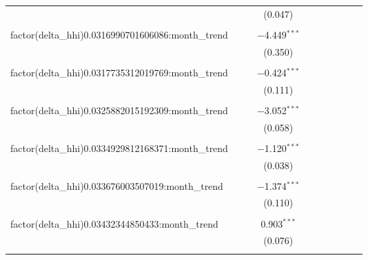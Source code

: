 \begin{table}[H]
{\begin{tabular}{@{\extracolsep{5pt}}lccccccccc}
   &  &  & (0.047) &  &  &  &  &  &  \\  

   & & & & & & & & & \\  

  factor(delta\_hhi)0.0316990701606086:month\_trend &  &  & $-$4.449$^{***}$ &  &  &  &  &  &  \\  

   &  &  & (0.350) &  &  &  &  &  &  \\  

   & & & & & & & & & \\  

  factor(delta\_hhi)0.0317735312019769:month\_trend &  &  & $-$0.424$^{***}$ &  &  &  &  &  &  \\  

   &  &  & (0.111) &  &  &  &  &  &  \\  

   & & & & & & & & & \\  

  factor(delta\_hhi)0.0325882015192309:month\_trend &  &  & $-$3.052$^{***}$ &  &  &  &  &  &  \\  

   &  &  & (0.058) &  &  &  &  &  &  \\  

   & & & & & & & & & \\  

  factor(delta\_hhi)0.0334929812168371:month\_trend &  &  & $-$1.120$^{***}$ &  &  &  &  &  &  \\  

   &  &  & (0.038) &  &  &  &  &  &  \\  

   & & & & & & & & & \\  

  factor(delta\_hhi)0.033676003507019:month\_trend &  &  & $-$1.374$^{***}$ &  &  &  &  &  &  \\  

   &  &  & (0.110) &  &  &  &  &  &  \\  

   & & & & & & & & & \\  

  factor(delta\_hhi)0.03432344850433:month\_trend &  &  & 0.903$^{***}$ &  &  &  &  &  &  \\  

   &  &  & (0.076) &  &  &  &  &  &  \\  

   & & & & & & & & & \\  


\end{tabular}}
\end{table}
